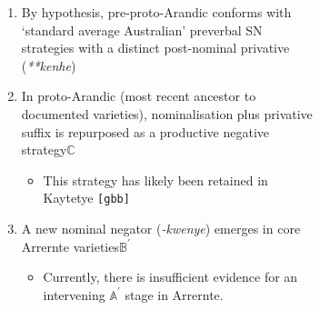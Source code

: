 \begin{figure}[H]
	\caption[Hypothesised reconstruction of the Arandic negative domain]{Summary of reconstructed changes in the Arandic negative domain in terms of NEC stages $ (\mathbb{A,B,C}) $}\label{arandic}
	\begin{subfigure}{.4\textwidth}
\end{subfigure}
\begin{subfigure}{.55\textwidth}
	\begin{enumerate}[\bf i]
		\item By hypothesis, pre-proto-Arandic conforms with `standard average Australian' preverbal SN strategies with a distinct post-nominal privative (\textit{**kenhe})
		\item In proto-Arandic (most recent ancestor to documented varieties), nominalisation plus privative suffix is repurposed as a productive negative strategy\hfill$\boldsymbol{\mathbb C}$
		\begin{itemize}
			\item This strategy has likely been retained in Kaytetye \texttt{[gbb]}
		\end{itemize}
		\item A new nominal negator (\textit{-kwenye}) emerges in core Arrernte varieties\hfill$\boldsymbol{\mathbb{B^\prime}}$
		\begin{itemize}
			\item Currently, there is insufficient evidence for an intervening $\boldsymbol{\mathbb{A^\prime}}$ stage in Arrernte.
		\end{itemize}	
	\end{enumerate}
\end{subfigure}
\end{figure}

